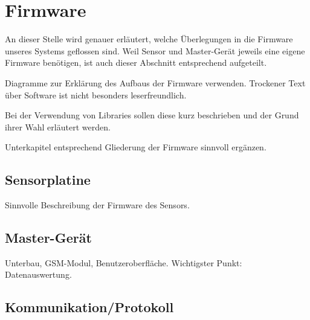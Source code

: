 \chapter{Firmware}
\label{chap:firmware}

An  dieser  Stelle wird  genauer  erl\"autert,  welche \"Uberlegungen  in  die
Firmware  unseres  Systems  geflossen  sind. Weil  Sensor  und  Master-Ger\"at
jeweils  eine   eigene  Firmware   ben\"otigen,  ist  auch   dieser  Abschnitt
entsprechend aufgeteilt.

\anweisung   Diagramme    zur   Erkl\"arung    des   Aufbaus    der   Firmware
verwenden. Trockener    Text    \"uber    Software   ist    nicht    besonders
leserfreundlich.

\anweisung Bei der Verwendung von  Libraries sollen diese kurz beschrieben und
der Grund ihrer Wahl erl\"autert werden.

\anweisung   Unterkapitel  entsprechend   Gliederung  der   Firmware  sinnvoll
erg\"anzen.

\section{Sensorplatine}
\label{sec:fw:sensorplatine}

Sinnvolle Beschreibung der Firmware des Sensors.


\section{Master-Ger\"at}
\label{sec:fw:mastergerat}

Unterbau, GSM-Modul, Benutzeroberfl\"ache. Wichtigster Punkt: Datenauswertung.


\section{Kommunikation/Protokoll}
\label{sec:fw:sensorplatine}

